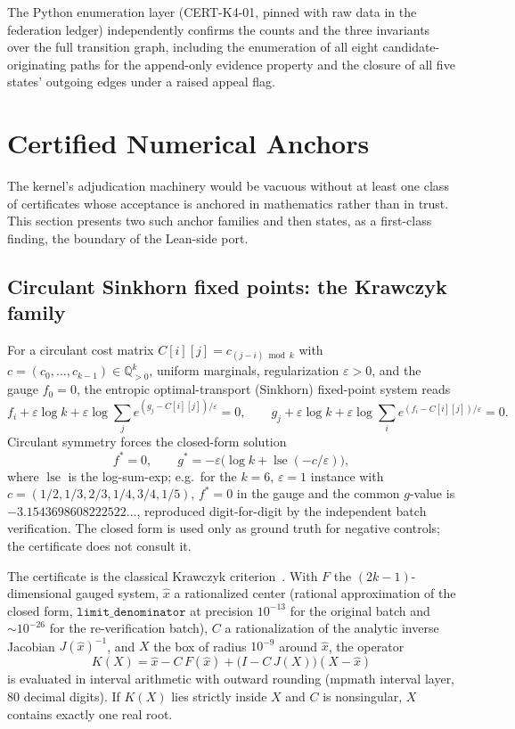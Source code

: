 \documentclass[11pt]{article}
\theoremstyle{definition}
\theoremstyle{remark}
\begin{document}
The Python enumeration layer (CERT-K4-01, pinned with raw data in the
federation ledger) independently confirms the counts and the three invariants
over the full transition graph, including the enumeration of all eight
candidate-originating paths for the append-only evidence property and the
closure of all five states' outgoing edges under a raised appeal flag.

\section{Certified Numerical Anchors}\label{sec:anchors}

The kernel's adjudication machinery would be vacuous without at least one
class of certificates whose acceptance is anchored in mathematics rather than
in trust. This section presents two such anchor families and then states,
as a first-class finding, the boundary of the Lean-side port.

\subsection{Circulant Sinkhorn fixed points: the Krawczyk family}
\label{sec:circ}

For a circulant cost matrix $C[i][j]=c_{(j-i)\bmod k}$ with
$c=(c_0,\dots,c_{k-1})\in\mathbb{Q}_{>0}^{k}$, uniform marginals,
regularization $\varepsilon>0$, and the gauge $f_0=0$, the entropic
optimal-transport (Sinkhorn) fixed-point system reads
\[
f_i+\varepsilon\log k+\varepsilon\log\sum_{j} e^{(g_j-C[i][j])/\varepsilon}=0,
\qquad
g_j+\varepsilon\log k+\varepsilon\log\sum_{i} e^{(f_i-C[i][j])/\varepsilon}=0 .
\]
Circulant symmetry forces the closed-form solution
\[
f^{*}=0,\qquad g^{*}=-\varepsilon\bigl(\log k+\operatorname{lse}(-c/\varepsilon)\bigr),
\]
where $\operatorname{lse}$ is the log-sum-exp; e.g.\ for the $k=6$,
$\varepsilon=1$ instance with $c=(1/2,1/3,2/3,1/4,3/4,1/5)$, $f^{*}=0$ in
the gauge and the common $g$-value is $-3.1543698608222522\ldots$, reproduced
digit-for-digit by the independent batch verification. The closed form is
used only as ground truth for negative controls; the certificate does not
consult it.

The certificate is the classical Krawczyk criterion~\cite{krawczyk1969}. With
$F$ the $(2k-1)$-dimensional gauged system, $\hat{x}$ a rationalized center
(rational approximation of the closed form, $\texttt{limit\_denominator}$ at
precision $10^{-13}$ for the original batch and $\sim 10^{-26}$ for the
re-verification batch), $C$ a rationalization of the analytic inverse
Jacobian $J(\hat{x})^{-1}$, and $X$ the box of radius $10^{-9}$ around
$\hat{x}$, the operator
\[
K(X) = \hat{x} - C\,F(\hat{x}) + \bigl(I - C\,J(X)\bigr)(X-\hat{x})
\]
is evaluated in interval arithmetic with outward rounding (mpmath interval
layer, 80 decimal digits). If $K(X)$ lies strictly inside $X$ and $C$ is
nonsingular, $X$ contains exactly one real root.
\end{document}
